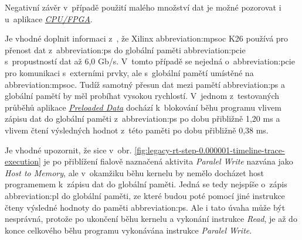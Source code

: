 \documentclass[a4paper, twoside, 11pt]{article}
\begin{document}
		Negativní závěr v~případě použití malého množství dat je možné pozorovat i u~aplikace \hyperref[subsec:poznatky-ziskane-profilovanim-aplikaci-cpu-fpga]{\textit{CPU/FPGA}}.\par
		Je vhodné doplnit informaci z~\cite{kria-k26-som-ds}, že Xilinx \gls{abbreviation:mpsoc} K26 používá pro přenost dat z~\gls{abbreviation:ps} do globální paměti \gls{abbreviation:pcie} s~propustností dat až 6,0 Gb/s. V~tomto případě se nejedná o~\gls{abbreviation:pcie} pro komunikaci s~externími prvky, ale s~globální pamětí umístěné na \gls{abbreviation:mpsoc}. Tudíž samotný přesun dat mezi pamětí \gls{abbreviation:ps} a globální pamětí by měl probíhat vysokou rychlostí. V~jednom z~testovaných průběhů aplikace \hyperref[subsec:preloaded-data]{\textit{Preloaded Data}} dochází k~blokování běhu programu vlivem zápisu dat do globální paměti z~\gls{abbreviation:ps} po dobu přibližně 1,20 ms a vlivem čtení výsledných hodnot z~této paměti po dobu přibližně 0,38 ms.\par
		Je vhodné upozornit, že sice v~obr. \ref{fig:legacy-rt-step-0.000001-timeline-trace-execution} je po přiblížení fialově naznačená aktivita \textit{Paralel Write} nazvána jako \textit{Host to Memory}, ale v~okamžiku běhu kernelu by nemělo docházet host programemem k~zápisu dat do globální paměti. Jedná se tedy nejspíše o~zápis \gls{abbreviation:pl} do globální paměti, ze které budou poté pomocí jiné instrukce čteny výsledné hodnoty do paměti \gls{abbreviation:ps}. Ale i tato úvaha může být nesprávná, protože po ukončení běhu kernelu a vykonání instrukce \textit{Read}, je až do konce celkového běhu programu vykonávána instrukce \textit{Paralel Write}.\par
		
	
\end{document}
